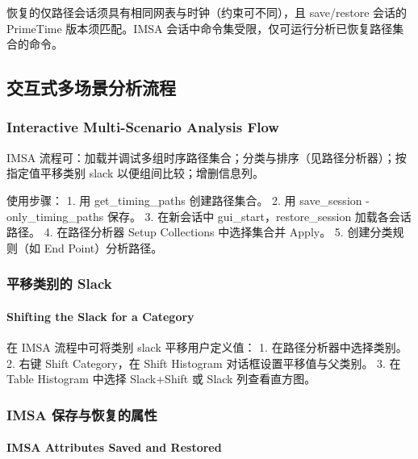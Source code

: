 \begin{noteBox}
恢复的仅路径会话须具有相同网表与时钟（约束可不同），且 save/restore 会话的 PrimeTime 版本须匹配。IMSA 会话中命令集受限，仅可运行分析已恢复路径集合的命令。
\end{noteBox}

\subsection{交互式多场景分析流程}
\subsubsection*{Interactive Multi-Scenario Analysis Flow}

IMSA 流程可：加载并调试多组时序路径集合；分类与排序（见路径分析器）；按指定值平移类别 slack 以便组间比较；增删信息列。

使用步骤：
1. 用 get_timing_paths 创建路径集合。
2. 用 save_session -only_timing_paths 保存。
3. 在新会话中 gui_start，restore_session 加载各会话路径。
4. 在路径分析器 Setup Collections 中选择集合并 Apply。
5. 创建分类规则（如 End Point）分析路径。

\subsubsection{平移类别的 Slack}
\paragraph*{Shifting the Slack for a Category}

在 IMSA 流程中可将类别 slack 平移用户定义值：
1. 在路径分析器中选择类别。
2. 右键 Shift Category，在 Shift Histogram 对话框设置平移值与父类别。
3. 在 Table Histogram 中选择 Slack+Shift 或 Slack 列查看直方图。




\subsubsection{IMSA 保存与恢复的属性}
\paragraph*{IMSA Attributes Saved and Restored}

